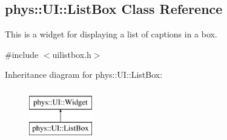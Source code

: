 \hypertarget{classphys_1_1UI_1_1ListBox}{
\subsection{phys::UI::ListBox Class Reference}
\label{classphys_1_1UI_1_1ListBox}
}


This is a widget for displaying a list of captions in a box.  




{\ttfamily \#include $<$uilistbox.h$>$}

Inheritance diagram for phys::UI::ListBox:\begin{figure}[H]
\begin{center}
\leavevmode
\includegraphics[height=2.000000cm]{classphys_1_1UI_1_1ListBox}
\end{center}
\end{figure}
